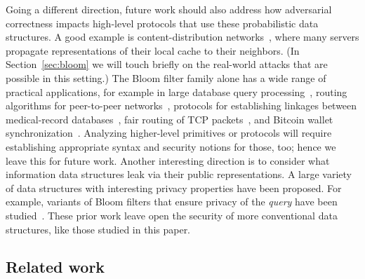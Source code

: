 Going a different direction, future work should
also address how adversarial correctness impacts high-level protocols that use
these probabilistic data structures. A good example is content-distribution
networks~\cite{byers2002informed}, where many servers propagate representations
of their local cache to their neighbors. (In Section~\ref{sec:bloom} we will
touch briefly on the real-world attacks that are possible in this setting.) The
Bloom filter family alone has a wide range of practical applications, for
example in large database query processing~\cite{broder2004network}, routing
algorithms for peer-to-peer networks~\cite{reynolds2003efficient}, protocols for
establishing linkages between medical-record databases~\cite{schnell2011novel},
fair routing of TCP packets~\cite{feng2001stochastic}, and Bitcoin wallet
synchronization~\cite{gervais2014privacy}.
%
Analyzing higher-level primitives or protocols will require establishing
appropriate syntax and security notions for those, too; hence we leave this for
future work.
%
Another interesting direction is to consider what information data structures
leak via their public representations. A large variety of data structures with
interesting privacy properties have been proposed. For example, variants of
Bloom filters that ensure privacy of the \emph{query} have been
studied~\cite{bellovin2004privacy,nojima2009cryptographically}. These prior work
leave open the security of more conventional data structures, like those studied
in this paper.


\subsection{Related work}



